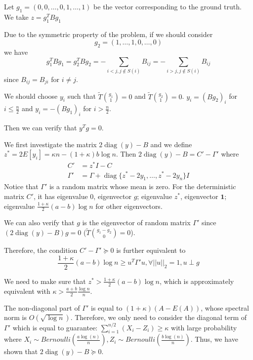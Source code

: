 \documentclass{article}
\DeclareMathOperator{\diag}{diag}
\newcommand{\A}{\frac{a \log(n)}{n}}
\newcommand{\B}{\frac{b \log(n)}{n}}
\begin{document}
Let $g_1 = (0, 0 ,\dots, 0, 1, \dots, 1)$ be the vector corresponding to the ground truth.
We take $z = g_1^T B g_1$

Due to the symmetric property of the problem, if we should consider
$$
g_2 = (1, \dots, 1 ,0, \dots, 0)
$$
we have
\begin{equation}
g_1^T B g_1 = g_2^T B g_2 = -\sum_{i<j, j \not\in S(i)} B_{ij}
= -\sum_{i>j, j \not\in S(i)} B_{ij}
\end{equation}
since $B_{ij} = B_{ji}$ for $i\neq j$.

We should choose $y_i$ such that $\widetilde{T} \binom{g_1}{1} = 0 $ and $\widetilde{T} \binom{g_2}{1} = 0$.
$y_i = (Bg_2)_i$ for $i \leq \frac{n}{2}$ 
and
$y_i = -(Bg_1)_i$ for $i > \frac{n}{2}$.

Then we can verify that $y^T  g = 0$.

We first investigate the matrix $2\diag(y) - B$ and we define $z^* = 2E[y_i]= \kappa n - (1+\kappa)b\log n$.
Then
$2\diag(y)- B = C'-\Gamma'$
where
\begin{align}
C' &= z^* I - C \\
\Gamma' & =  \Gamma +  \diag\{z^* - 2y_1, \dots, z^* - 2y_n\} I 
\end{align}
Notice that $\Gamma'$ is a random matrix whose mean is zero.
For the deterministic matrix $C'$, it has eigenvalue $0$, eigenvector $g$;
eigenvalue $z^*$, eigenvector $\mathbf{1}$; eigenvalue $\frac{1+\kappa}{2}(a-b)\log n$ for other eigenvectors.

We can also verify that $g$ is the eigenvector of random matrix $\Gamma'$ since $(2\diag(y) - B)g=0$ ($\widetilde{T} \binom{g_1 - g_2}{0} = 0$).


Therefore, the condition $C' - \Gamma' \succeq 0$ is further equivalent to
\begin{equation}\label{eq:g1}
\frac{1+\kappa}{2}(a-b)\log n \geq u^T \Gamma' u, \forall ||u||_2 = 1, u \perp g
\end{equation}

We need to make sure that $z^* > \frac{1+\kappa}{2}(a-b)\log n$, which is approximately equivalent with
$\kappa > \frac{a+b}{2} \frac{\log n}{n}$.

The non-diagonal part of $\Gamma'$ is equal to $(1+\kappa)(A-E(A))$, whose spectral norm is $O(\sqrt{\log n})$.
Therefore, we only need to consider the diagonal term of $\Gamma'$ which is equal to guarantee:
$
\sum_{i=1}^{n/2} (X_i - Z_i) \geq \kappa
$ with large probability where $X_i \sim Bernoulli(\A), Z_i \sim Bernoulli(\B)$.
Thus, we have shown that $2\diag(y) - B \succeq 0$.
\end{document}
